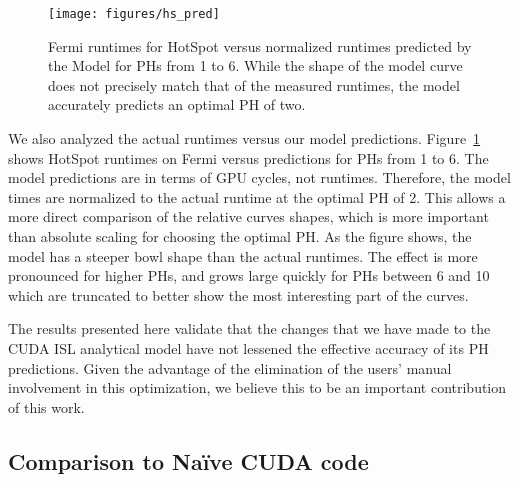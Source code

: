 \documentclass{sig-alternate}
\begin{document}
\begin{figure}
\texttt{[image: figures/hs\_pred]}
\caption{Fermi runtimes for HotSpot versus normalized runtimes predicted by
  the Model for PHs from 1 to 6.  While the shape of the model curve does not
  precisely match that of the measured runtimes, the model accurately
  predicts an optimal PH of two.}
\label{fig:modelvsactual}
\end{figure}

We also analyzed the actual runtimes versus our model predictions.
Figure~\ref{fig:modelvsactual} shows HotSpot runtimes on Fermi versus
predictions for PHs from 1 to 6.  The model predictions are in terms of GPU
cycles, not runtimes.  Therefore, the model times are normalized to the
actual runtime at the optimal PH of 2.  This allows a more direct comparison
of the relative curves shapes, which is more important than absolute scaling
for choosing the optimal PH.  As the figure shows, the model has a steeper
bowl shape than the actual runtimes.  The effect is more pronounced for
higher PHs, and grows large quickly for PHs between 6 and 10 which are
truncated to better show the most interesting part of the curves.

The results presented here validate that the changes that we have made to the
CUDA ISL analytical model have not lessened the effective accuracy of its PH
predictions.  Given the advantage of the elimination of the users' manual
involvement in this optimization, we believe this to be an important
contribution of this work.

\subsection{Comparison to Na\"{i}ve CUDA code}
\end{document}
